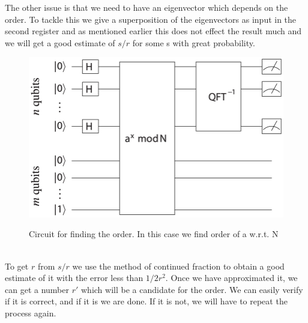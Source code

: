 The other issue is that we need to have an eigenvector which depends on the order. To tackle this we give a superposition of the eigenvectors as input in the second register and as mentioned earlier this does not effect the result much and we will get a good estimate of $s/r$ for some s with great probability.\\
\begin{figure}[h]
\centering
\includegraphics[width=1\textwidth]{images/order.png}
\label{order}
\caption{Circuit for finding the order. In this case we find order of  a w.r.t. N}
\end{figure}
\\To get $r$ from $s/r$ we use the method of continued fraction to obtain a good estimate of it with the error less than $1/2r^2$. Once we have approximated it, we can get a number $r'$ which will be a candidate for the order. We can easily verify if it is correct, and if it is we are done. If it is not, we will have to repeat the process again. 
\newpage
